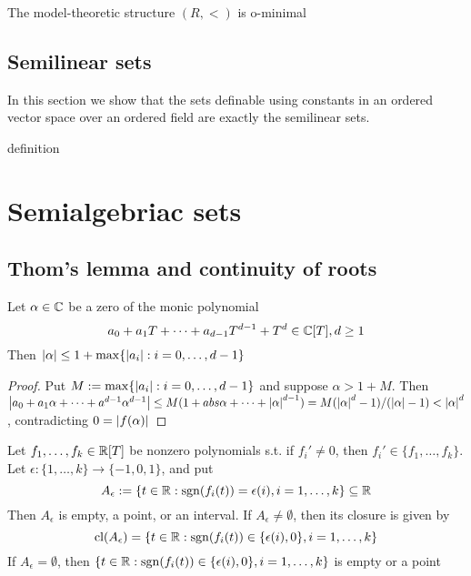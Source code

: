 \documentclass[11pt]{article}
\begin{document}
\begin{corollary}[]
The model-theoretic structure \((R,<)\) is o-minimal
\end{corollary}
\subsection{Semilinear sets}
\label{sec:orgfe7f5e0}
In this section we show that the sets definable using constants in an ordered vector space over
an ordered field are exactly the semilinear sets.

definition
\section{Semialgebriac sets}
\label{sec:org3d00320}
\subsection{Thom's lemma and continuity of roots}
\label{sec:org321e374}
\begin{lemma}[]
Let \(\alpha\in\mathbb{C}\) be a zero of the monic polynomial
\begin{equation*}
a_0+a_1T+\dots+a_{d-1}T^{d-1}+T^d\in\mathbb{C}[T],d\ge 1
\end{equation*}
Then \(\abs{\alpha}\le 1+\max\{\abs{a_i}:i=0,\dots,d-1\}\)
\end{lemma}

\begin{proof}
Put \(M:=\max\{\abs{a_i}:i=0,\dots,d-1\}\) and suppose \(\alpha>1+M\). Then
\(\abs{a_0+a_1\alpha+\dots+a^{d-1}\alpha^{d-1}}\le M(1+abs{\alpha}+\dots+\abs{\alpha}^{d-1})=M(\abs{\alpha}^d-1)/(\abs{\alpha}-1)<\abs{\alpha}^d\),
contradicting \(0=\abs{f(\alpha)}\)
\end{proof}

\begin{lemma}[Thom]
Let \(f_1,\dots,f_k\in\mathbb{R}[T]\) be nonzero polynomials s.t. if \(f_i'\neq 0\), then \(f_i'\in\{f_1,\dots,f_k\}\).
Let \(\epsilon:\{1,\dots,k\}\to\{-1,0,1\}\), and put
\begin{equation*}
A_\epsilon:=\{t\in\mathbb{R}:\operatorname{sgn}(f_i(t))=\epsilon(i),i=1,\dots,k\}\subseteq\mathbb{R}
\end{equation*}
Then \(A_\epsilon\) is empty, a point, or an interval. If \(A_\epsilon\neq\emptyset\), then its closure is given by
\begin{equation*}
\operatorname{\text{cl}}(A_\epsilon)=\{t\in\mathbb{R}:\operatorname{sgn}(f_i(t))\in\{\epsilon(i),0\},i=1,\dots,k\}
\end{equation*}
If \(A_\epsilon=\emptyset\), then \(\{t\in\mathbb{R}:\operatorname{sgn}(f_i(t))\in\{\epsilon(i),0\},i=1,\dots,k\}\) is empty or a point
\end{lemma}
\end{document}
